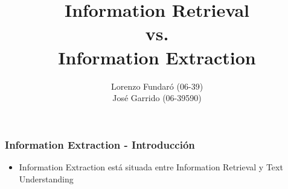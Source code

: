 \documentclass[xcolor=dvipsnames]{beamer}
\author{Lorenzo Fundaró (06-39)\\ José Garrido (06-39590)}
\title{Information Retrieval \\vs. \\Information Extraction}
\institute{Universidad Simón Bolívar\\Inteligencia Artificial 2}
\begin{document}
\begin{frame}
\titlepage
\end{frame}


\begin{frame}
\frametitle{Information Extraction - Introducción}
\begin{itemize}
 \item Information Extraction está situada entre Information Retrieval y Text Understanding
\end{itemize}
\end{frame}
\end{document}
